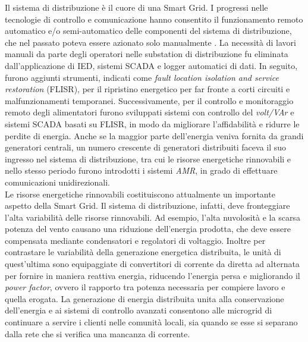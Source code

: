 Il sistema di distribuzione è il cuore di una Smart Grid. I progressi nelle tecnologie di controllo e comunicazione hanno consentito il funzionamento remoto automatico e/o semi-automatico delle componenti del sistema di distribuzione, che nel passato poteva essere azionato solo manualmente \cite{dist1}. 
La necessità di lavori manuali da parte degli operatori nelle substation di distribuzione fu eliminata dall'applicazione di IED, sistemi SCADA e logger automatici di dati. In seguito, furono aggiunti strumenti, indicati come \emph{fault location isolation and service restoration} (FLISR), per il ripristino energetico per far fronte a corti circuiti e malfunzionamenti temporanei. Successivamente,  per il controllo e monitoraggio remoto degli alimentatori furono sviluppati sistemi con controllo del \emph{volt/VAr} e sistemi SCADA basati su FLISR, in modo da migliorare l'affidabilità e ridurre le perdite di energia. Anche se la maggior parte dell'energia veniva fornita da grandi generatori centrali, un numero crescente di generatori distribuiti faceva il suo ingresso nel sistema di distribuzione, tra cui le risorse energetiche rinnovabili e nello stesso periodo furono introdotti i sistemi \emph{AMR}, in grado di effettuare comunicazioni unidirezionali. 
\\
Le risorse energetiche rinnovabili costituiscono attualmente un importante aspetto della Smart Grid. Il sistema di distribuzione, infatti, deve fronteggiare l'alta variabilità delle risorse rinnovabili. Ad esempio, l'alta nuvolosità e la scarsa potenza del vento causano una riduzione dell'energia prodotta, che deve essere compensata mediante condensatori e regolatori di voltaggio. Inoltre per contrastare le variabilità della generazione energetica distribuita, le unità di quest'ultima sono equipaggiate di convertitori di corrente da diretta ad alternata per fornire in maniera reattiva energia, riducendo l'energia persa e migliorando il \emph{power factor}, ovvero il rapporto tra potenza necessaria per compiere lavoro e quella erogata. La generazione di energia distribuita unita alla conservazione dell'energia e ai sistemi di controllo avanzati consentono alle microgrid di continuare a servire i clienti nelle comunità locali, sia quando se esse si separano dalla rete che si verifica una mancanza di corrente. 
